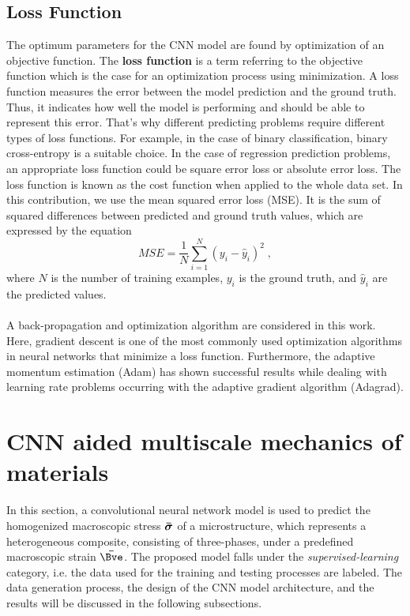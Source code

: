 \documentclass[final,3p,times]{elsarticle}
\begin{document}
\subsection{Loss Function}
The optimum parameters for the CNN model are found by optimization of an objective function. The \textbf{loss function} is a term referring to the objective function which is the case for an optimization process using minimization. A loss function measures the error between the model prediction and the ground truth. Thus, it indicates how well the model is performing and should be able to represent this error. That's why different predicting problems require different types of loss functions. For example, in the case of binary classification, binary cross-entropy is a suitable choice. In the case of regression prediction problems, an appropriate loss function could be square error loss or absolute error loss. The loss function is known as the cost function when applied to the whole data set. In this contribution, we use the mean squared error loss (MSE). It is the sum of squared differences between predicted and ground truth values, which are expressed by the equation
\begin{equation}
MSE =  \frac{1}{N}\sum_{i=1}^{N} (y_{i} - \widehat{y}_i)^2 \; ,
\end{equation}
where $N$ is the number of training examples, $y_i$ is the ground truth, and $\widehat{y}_i$ are the predicted values. 
\\
\\
A back-propagation and optimization algorithm are considered in this work. Here, gradient descent is one of the most commonly used optimization algorithms in neural networks that minimize a loss function. Furthermore, the adaptive momentum estimation (Adam) has shown successful results while dealing with learning rate problems occurring with the adaptive gradient algorithm (Adagrad).





\section{CNN aided multiscale mechanics of materials }
\label{sec4-CNN}

In this section, a convolutional neural network model is used to predict the homogenized macroscopic stress $\boldsymbol{\Bar{\sigma}}$ of a microstructure, which represents a heterogeneous composite, consisting of three-phases, under a predefined macroscopic strain $\boldsymbol{\Bar{\Bve}}$. The proposed model falls under the {\it supervised-learning} category, i.e. the data used for the training and testing processes are labeled. The data generation process, the design of the CNN model architecture, and the results will be discussed in the following subsections.
\end{document}
